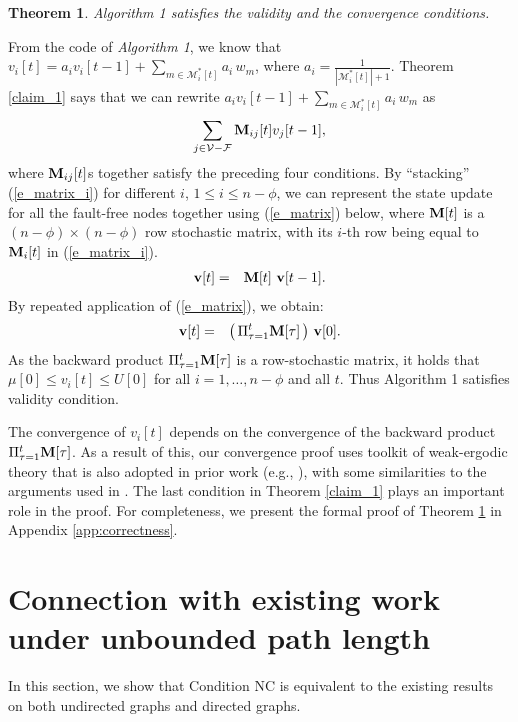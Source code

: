 \documentclass[letterpaper, 11pt]{article}
\newtheorem{theorem}{Theorem}[section]
\newcommand{\calF}{{\mathcal{F}}}
\newcommand{\calM}{{\mathcal{M}}}
\newcommand{\calV}{{\mathcal{V}}}
\begin{document}
\begin{theorem}
\label{t}
\emph {Algorithm 1} satisfies the validity and the convergence conditions.
\end{theorem}



From the code of \emph {Algorithm 1}, we know that $v_i[t]=a_{i} v_i[t-1]+\sum_{m\in \calM_{i}^*[t]} a_{i} \, w_m$, where $a_i=\frac{1}{|\calM^*_i[t]|+1}$. Theorem \ref{claim_1} says that we can rewrite $a_{i} v_i[t-1]+\sum_{m\in \calM_{i}^*[t]} a_{i} \, w_m$ as
\[
\sum_{j\in \calV-\calF} {\bf M}_{ij}[t]v_j[t-1],
\]
where ${\bf M}_{ij}[t]$s together satisfy the preceding four conditions. By ``stacking'' (\ref{e_matrix_i}) for different
$i$, $1\leq i\leq n-\phi$, we can
represent the state update for all the fault-free nodes together
using (\ref{e_matrix})
below, where ${\bf{M}}[t]$ is a $(n-\phi)\times (n-\phi)$ row stochastic matrix, with its $i$-th row
being equal to ${\bf{M}}_i[t]$ in (\ref{e_matrix_i}).
\begin{eqnarray}
{\bf{v}}[t] & = & {\bf{M}}[t] ~ {\bf{v}}[t-1].
\label{e_matrix}
\end{eqnarray}
By repeated application of (\ref{e_matrix}), we obtain:
\begin{eqnarray*}
{\bf{v}}[t] & = & \left(\,\Pi_{\tau=1}^t {\bf{M}}[\tau]\,\right)\, {\bf{v}}[0].
\end{eqnarray*}
As the backward product $\Pi_{\tau=1}^t {\bf{M}}[\tau]$ is a row-stochastic matrix, it holds that $\mu[0]\le v_i[t]\le U[0]$ for all $i=1, \ldots, n-\phi$ and all $t$. Thus Algorithm 1 satisfies validity condition.

The convergence of $v_i[t]$ depends on the convergence of the backward product $\Pi_{\tau=1}^t {\bf{M}}[\tau]$. As a result of this, our convergence proof uses toolkit of weak-ergodic theory that is also adopted in prior work
(e.g., \cite{Jadbabaie2003,Benezit,vaidyaII,leblanc_HiCoNs}),
with some similarities to the arguments used in \cite{vaidyaII,leblanc_HiCoNs}. The last condition in Theorem \ref{claim_1} plays an important role in the proof. For completeness, we present the formal proof of Theorem \ref{t} in Appendix \ref{app:correctness}.











\section{Connection with existing work under unbounded path length}
In this section, we show that Condition NC is equivalent to the existing results on both undirected graphs and directed graphs.  
\end{document}
